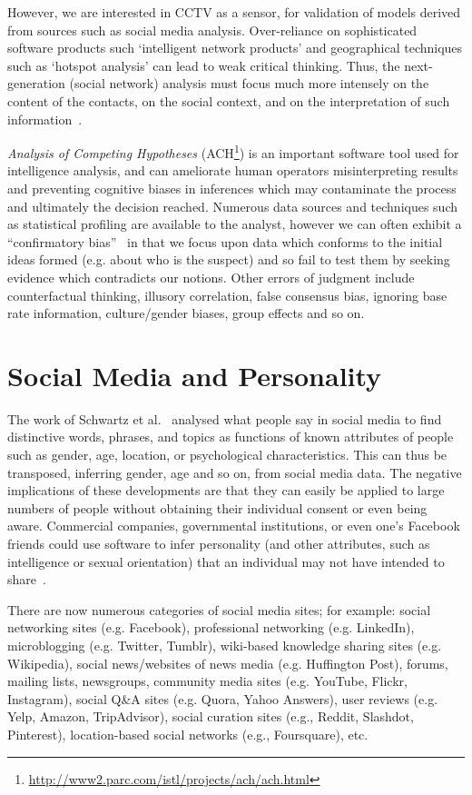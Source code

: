 \documentclass[conference]{IEEEtran}
\begin{document}
However, we are interested in CCTV as a sensor, for validation of
models derived from sources such as social media
analysis. Over-reliance on sophisticated software products such
`intelligent network products' and geographical techniques such as
`hotspot analysis' can lead to weak critical thinking. Thus, the
next-generation (social network) analysis must focus much more
intensely on the content of the contacts, on the social context, and
on the interpretation of such information~\cite{klerks:2001}.

{\emph{Analysis of Competing Hypotheses}}
(ACH\footnote{\url{http://www2.parc.com/istl/projects/ach/ach.html}})
is an important software tool used for intelligence analysis, and can
ameliorate human operators misinterpreting results and preventing
cognitive biases in inferences which may contaminate the process and
ultimately the decision reached. Numerous data sources and techniques
such as statistical profiling are available to the analyst, however we
can often exhibit a ``confirmatory
bias''~\cite{lipton:2002,lipton:2005} in that we focus upon data which
conforms to the initial ideas formed (e.g. about who is the suspect)
and so fail to test them by seeking evidence which contradicts our
notions. Other errors of judgment include counterfactual thinking,
illusory correlation, false consensus bias, ignoring base rate
information, culture/gender biases, group effects and so on.

\section{Social Media and Personality}\label{socmed+pers}

The work of Schwartz et al.~\cite{schwartz-et-al:2013} analysed what
people say in social media to find distinctive words, phrases, and
topics as functions of known attributes of people such as gender, age,
location, or psychological characteristics. This can thus be
transposed, inferring gender, age and so on, from social media
data. The negative implications of these developments are that they
can easily be applied to large numbers of people without obtaining
their individual consent or even being aware. Commercial companies,
governmental institutions, or even one’s Facebook friends could use
software to infer personality (and other attributes, such as
intelligence or sexual orientation) that an individual may not have
intended to share~\cite{lambiotte+kosinski:2014}.

There are now numerous categories of social media sites; for example:
social networking sites (e.g. Facebook), professional networking
(e.g. LinkedIn), microblogging (e.g. Twitter, Tumblr), wiki-based
knowledge sharing sites (e.g.  Wikipedia), social news/websites of
news media (e.g. Huffington Post), forums, mailing lists, newsgroups,
community media sites (e.g. YouTube, Flickr, Instagram), social Q\&A
sites (e.g. Quora, Yahoo Answers), user reviews (e.g. Yelp, Amazon,
TripAdvisor), social curation sites (e.g., Reddit, Slashdot,
Pinterest), location-based social networks (e.g., Foursquare), etc.
\end{document}
